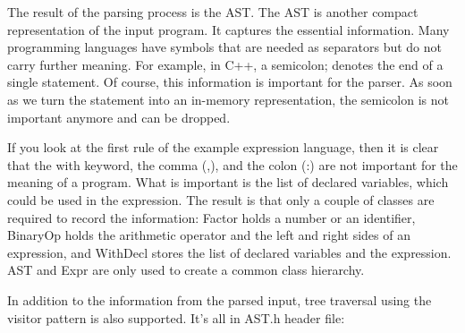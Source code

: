 
The result of the parsing process is the AST. The AST is another compact representation of the input program. It captures the essential information. Many programming languages have symbols that are needed as separators but do not carry further meaning. For example, in C++, a semicolon; denotes the end of a single statement. Of course, this information is important for the parser. As soon as we turn the statement into an in-memory representation, the semicolon is not important anymore and can be dropped.

If you look at the first rule of the example expression language, then it is clear that the with keyword, the comma (,), and the colon (:) are not important for the meaning of a program. What is important is the list of declared variables, which could be used in the expression. The result is that only a couple of classes are required to record the information: Factor holds a number or an identifier, BinaryOp holds the arithmetic operator and the left and right sides of an expression, and WithDecl stores the list of declared variables and the expression. AST and Expr are only used to create a common class hierarchy.

In addition to the information from the parsed input, tree traversal using the visitor pattern is also supported. It’s all in AST.h header file:

